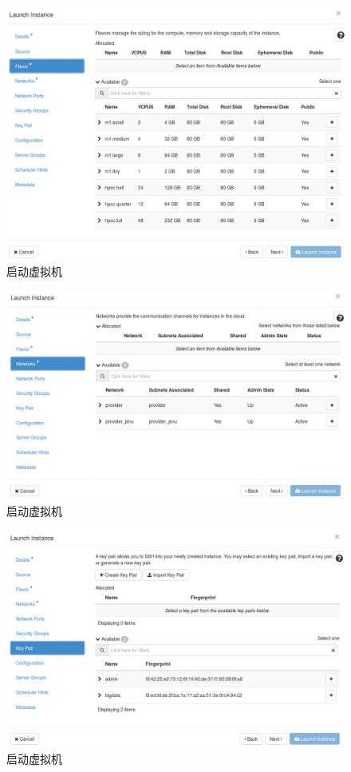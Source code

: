 \documentclass[12pt]{article}
\begin{document}
\begin{figure}[!htb]
\centering
\includegraphics[width=6in]{./figures/LaunchInstanceII}
\caption{启动虚拟机}
\label{fig:launchInstanceII}
\end{figure}
\begin{figure}[!htb]
\centering
\includegraphics[width=6in]{./figures/LaunchInstanceIII}
\caption{启动虚拟机}
\label{fig:launchInstanceIII}
\end{figure}
\begin{figure}[!htb]
\centering
\includegraphics[width=6in]{./figures/LaunchInstanceKey}
\caption{启动虚拟机}
\label{fig:launchInstanceKey}
\end{figure}
\end{document}
